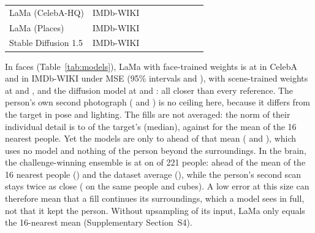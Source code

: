 \begin{table}[t]
\begin{tabular}{@{}llrrrrrrr@{}}
LaMa (CelebA-HQ) & IMDb-WIKI & \mfLamaHqImdbN{} & \textbf{\mfLamaHqImdbMse{}} & \mfLamaHqImdbSsim{} & \mfLamaHqImdbRefRepeatMse{} & \mfLamaHqImdbRefSoftMse{} & \mfLamaHqImdbRefNearestMse{} & \mfLamaHqImdbRefMeanMse{} \\
LaMa (Places) & IMDb-WIKI & \mfLamaPlacesImdbN{} & \textbf{\mfLamaPlacesImdbMse{}} & \mfLamaPlacesImdbSsim{} & \mfLamaPlacesImdbRefRepeatMse{} & \mfLamaPlacesImdbRefSoftMse{} & \mfLamaPlacesImdbRefNearestMse{} & \mfLamaPlacesImdbRefMeanMse{} \\
Stable Diffusion 1.5 & IMDb-WIKI & \mfSdImdbN{} & \textbf{\mfSdImdbMse{}} & \mfSdImdbSsim{} & \mfSdImdbRefRepeatMse{} & \mfSdImdbRefSoftMse{} & \mfSdImdbRefNearestMse{} & \mfSdImdbRefMeanMse{} \\
\bottomrule
\end{tabular}
\end{table}
In faces (Table~\ref{tab:models}), LaMa with face-trained weights is at \mfLamaHqCelebaMse{} in CelebA and \mfLamaHqImdbMse{} in IMDb-WIKI under \ac{MSE} (95\% intervals \mfLamaHqCelebaMseCi{} and \mfLamaHqImdbMseCi{}), with scene-trained weights at \mfLamaPlacesCelebaMse{} and \mfLamaPlacesImdbMse{}, and the diffusion model at \mfSdCelebaMse{} and \mfSdImdbMse{}: all closer than every reference. The person's own second photograph (\mfLamaHqCelebaRefRepeatMse{} and \mfLamaHqImdbRefRepeatMse{}) is no ceiling here, because it differs from the target in pose and lighting.
The fills are not averaged: the norm of their individual detail is \mfFaceDetailMin{} to \mfFaceDetailMax{} of the target's (median), against \mfLamaHqCelebaRefNearestDetail{} for the mean of the 16 nearest people.
Yet the models are only \mfFaceAheadMin{} to \mfFaceAheadMax{} ahead of that mean (\mfLamaHqCelebaRefNearestMse{} and \mfLamaHqImdbRefNearestMse{}), which uses no model and nothing of the person beyond the surroundings.
In the brain, the challenge-winning ensemble is at \mfBratsQtimMse{} \mfBratsQtimMseCi{} on \mfBratsQtimN{} of 221 people: ahead of the mean of the 16 nearest people (\mfBratsQtimRefNearestMse{}) and the dataset average (\mfBratsQtimRefMeanMse{}), while the person's second scan stays twice as close (\mfBratsQtimRefRepeatMse{} on the same people and cubes).
A low error at this size can therefore mean that a fill continues its surroundings, which a model sees in full, not that it kept the person.
Without upsampling of its input, LaMa only equals the 16-nearest mean (Supplementary Section~S4).

